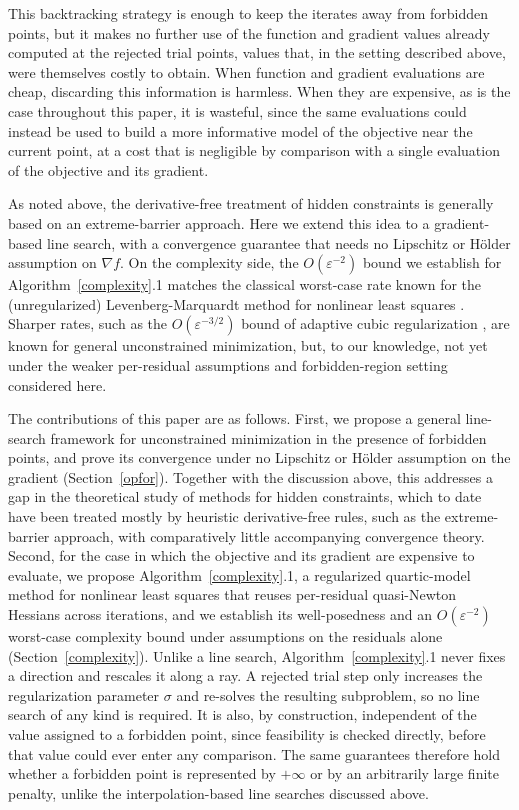 \documentclass{article}
\begin{document}
This backtracking strategy is enough to keep the iterates away from forbidden points, but it makes no further use of the function
and gradient values already computed at the rejected trial points, values that, in the setting described above, were themselves
costly to obtain. When function and gradient evaluations are cheap, discarding this information is harmless. When they are
expensive, as is the case throughout this paper, it is wasteful, since the same evaluations could instead be used to build a more
informative model of the objective near the current point, at a cost that is negligible by comparison with a single evaluation
of the objective and its gradient.

As noted above, the derivative-free treatment of hidden constraints is generally based on an extreme-barrier approach. Here we
extend this idea to a gradient-based line search, with a convergence guarantee that needs no Lipschitz or H\"older assumption
on $\nabla f$. On the complexity side, the
$O(\varepsilon^{-2})$ bound we establish for Algorithm~\ref{complexity}.1 matches the classical worst-case rate known for the (unregularized)
Levenberg-Marquardt method for nonlinear least squares \cite{Martinez2024,UedaYamashita2010}. Sharper rates, such as the $O(\varepsilon^{-3/2})$
bound of adaptive cubic regularization \cite{CartisGouldToint2011a,CartisGouldToint2011b}, are known for general unconstrained
minimization, but, to our knowledge, not yet under the weaker per-residual assumptions and forbidden-region setting considered
here.

The contributions of this paper are as follows. First, we propose a general line-search framework for unconstrained
minimization in the presence of forbidden points, and prove its convergence under no Lipschitz or H\"older assumption on the
gradient (Section~\ref{opfor}). Together with the discussion above, this addresses a gap in the theoretical study of methods
for hidden constraints, which to date have been treated mostly by heuristic derivative-free rules, such as the extreme-barrier
approach, with comparatively little accompanying convergence theory. Second, for the case in which the objective and its
gradient are expensive to evaluate, we propose Algorithm~\ref{complexity}.1, a regularized quartic-model method for nonlinear least squares
that reuses per-residual quasi-Newton Hessians across iterations, and we establish its well-posedness and an
$O(\varepsilon^{-2})$ worst-case complexity bound under assumptions on the residuals alone (Section~\ref{complexity}). Unlike a
line search, Algorithm~\ref{complexity}.1 never fixes a direction and rescales it along a ray. A rejected trial step only increases the
regularization parameter $\sigma$ and re-solves the resulting subproblem, so no line search of any kind is required. It is
also, by construction, independent of the value assigned to a forbidden point, since feasibility is checked directly, before
that value could ever enter any comparison. The same guarantees therefore hold whether a forbidden point is represented by
$+\infty$ or by an arbitrarily large finite penalty, unlike the interpolation-based line searches discussed above.
\end{document}

